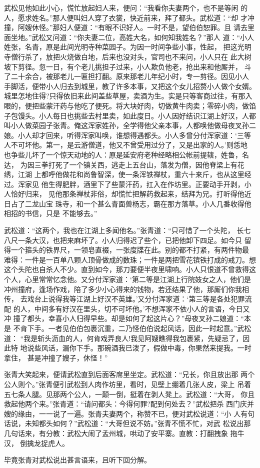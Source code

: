 武松见他如此小心，慌忙放起妇人来，便问：“我看你夫妻两个，也不是等闲
的人，愿求姓名。”那人便叫妇人穿了衣裳，快近前来，拜了都头。武松道：“却
才冲撞，阿嫂休怪。”那妇人便道：“有眼不识好人。一时不是，望伯伯恕罪。且
请去里面坐地。”武松又问道：“你夫妻二位，高姓大名，如何知我姓名？”那人
道：“小人姓张，名青，原是此间光明寺种菜园子。为因一时间争些小事，性起，
把这光明寺僧行杀了，放把火烧做白地，后来也没对头，官司也不来问，小人只在
此大树坡下剪径。忽一日，有个老儿挑担子过来，小人欺负他老，抢出来和他厮并，
斗了二十余合，被那老儿一匾担打翻。原来那老儿年纪小时，专一剪径。因见小人
手脚活，便带小人归去到城里，教了许多本事，又把这个女儿招赘小人做个女婿。
城里怎地住得?只得依旧来此间盖些草屋，卖酒为生。实是只等客商过往，有那入
眼的，便把些蒙汗药与他吃了便死。将大块好肉，切做黄牛肉卖；零碎小肉，做馅
子包馒头。小人每日也挑些去村里卖，如此度日。小人因好结识江湖上好汉，人都
叫小人做菜园子张青。俺这浑家姓孙，全学得他父亲本事，人都唤他做母夜叉孙二
娘。小人却才回来，听得浑家叫唤，谁想得遇都头。小人多曾分付浑家道：‘三等
人不可坏他。第一，是云游僧道，他又不曾受用过分了，又是出家的人。’则恁地
也争些儿坏了一个惊天动地的人：原是延安府老种经略相公帐前提辖，姓鲁，名达，
为因三拳打死了一个镇关西，逃走上五台山，落发为僧，因他脊梁上有花绣，江湖
上都呼他做花和尚鲁智深，使一条浑铁禅杖，重六十来斤，也从这里经过。浑家见
他生得肥胖，酒里下了些蒙汗药，扛入在作坊里。正要动手开剥，小人恰好归来，
见他那条禅杖非俗，却慌忙把解药救起来，结拜为兄。打听得他近日占了二龙山宝
珠寺，和一个甚么青面兽杨志，霸在那方落草。小人几番收得他相招的书信，只是
不能够去。”

武松道：“这两个，我也在江湖上多闻他名。”张青道：“只可惜了一个头陀，
长七八尺一条大汉，也把来麻坏了。小人归得迟了些个，已把他卸下四足。如今只
留得一个箍头的铁界尺，一领皂直裰，一张度牒在此。别的都不打紧，有两件物最
难得：一件是一百单八颗人顶骨做成的数珠；一件是两把雪花镔铁打成的戒刀。想
这个头陀也自杀人不少。直到如今，那刀要便半夜里啸响。小人只恨道不曾救得这
个人，心里常常忆念他。又分付浑家道：‘第二等是江湖上行院妓女之人，他们是
冲州撞府，逢场作戏，陪了多少小心得来的钱物，若还结果了他，那厮们你我相传，
去戏台上说得我等江湖上好汉不英雄。’又分付浑家道：‘第三等是各处犯罪流配
的人，中间多有好汉在里头，切不可坏他。’不想浑家不依小人的言语，今日又冲
撞了都头，幸喜小人归得早些。却是如何了起这片心？”母夜叉孙二娘道：“本是
不肯下手。一者见伯伯包裹沉重，二乃怪伯伯说起风话，因此一时起意。”武松道：
“我是斩头沥血的人，何肯戏弄良人!我见阿嫂瞧得我包裹紧，先疑忌了，因此特
地说些风话，漏你下手。那碗酒我已泼了，假做中毒，你果然来提我。一时拿住，
甚是冲撞了嫂子，休怪！”

张青大笑起来，便请武松直到后面客席里坐定。武松道：“兄长，你且放出那
两个公人则个。”张青便引武松到人肉作坊里，看时，见壁上绷着几张人皮，梁上
吊着五七条人腿。见那两个公人，一颠一倒，挺着在剥人凳上。武松道：“大哥，
你且救起他两个来。”张青道：“请问都头：今得何罪?配到何处去？”武松把杀
西门庆并嫂的缘由，一一说了一遍。张青夫妻两个，称赞不已，便对武松说道：“小
人有句话说，未知都头如何？”武松道：“大哥但说不妨。”张青不慌不忙，对武
松说出那几句话来，有分教：武松大闹了孟州城，哄动了安平寨。直教：打翻拽象
拖牛汉，倒擒龙捉虎人。

毕竟张青对武松说出甚言语来，且听下回分解。